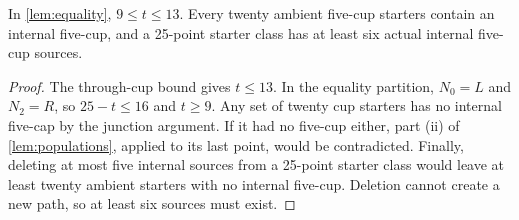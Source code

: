 \begin{corollary}\label{cor:range}
In \cref{lem:equality}, $9\le t\le13$. Every twenty ambient five-cup
starters contain an internal five-cup, and a 25-point starter class
has at least six actual internal five-cup sources.
\end{corollary}
\begin{proof}
The through-cup bound gives $t\le13$. In the equality partition,
$N_0=L$ and $N_2=R$, so $25-t\le16$ and $t\ge9$.
Any set of twenty cup starters has no internal five-cap by the
junction argument. If it had no five-cup either, part (ii) of
\cref{lem:populations}, applied to its last point, would be contradicted.
Finally, deleting at most five internal sources from a 25-point starter
class would leave at least twenty ambient starters with no internal
five-cup. Deletion cannot create a new path, so at least six sources
must exist.
\end{proof}


